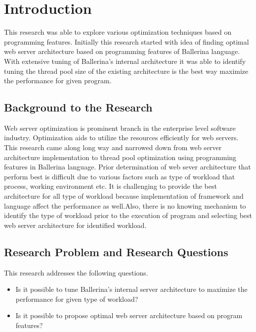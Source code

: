 \chapter{Introduction}

This research was able to explore various optimization techniques based on programming features. Initially this research started with idea of finding optimal web server architecture based on programming features of Ballerina language. With extensive tuning of Ballerina's internal architecture it was able to identify tuning the thread pool size of the existing architecture is the best way maximize the performance for given program.

\section{Background to the Research}

Web server optimization is prominent branch in the enterprise level software industry. Optimization aids to utilize the resources efficiently for web servers. This research came along long way and narrowed down from web server architecture implementation to thread pool optimization using programming features in Ballerina language. Prior determination of web sever architecture that perform best is difficult due to various factors such as type of workload that process, working environment \cite{comp_ac} etc. It is challenging to provide the best architecture for all type of workload \cite{seda,events_are_bad,edprs} because implementation of framework and language affect the performance as well.Also, there is no knowing mechanism to identify the type of workload prior to the execution of program and selecting best web server architecture for identified workload. 

\newpage

\section{Research Problem and Research Questions}

This research addresses the following questions.


\begin{itemize}
 \item Is it possible to tune Ballerina's internal server architecture to maximize the performance for given type of workload?
 \item Is it possible to propose optimal web server architecture based on program features?
\end{itemize}


